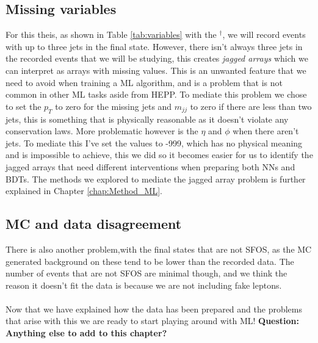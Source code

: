 \documentclass[14pt, a4paper]{book}
\begin{document}
\subsection{Missing variables}\label{sec:jagged_arrays}
For this theis, as shown in Table \ref{tab:variables} with the $^\dagger$, we will record events with up to three jets in the final state. However, there isn't always three jets in the recorded events that we will be studying, 
this creates \textit{jagged arrays} which we can interpret as arrays with missing values. This is an unwanted feature that we need to avoid when training a ML algorithm, and is a problem that is not common in other ML tasks aside from HEPP.
To mediate this problem we chose to set the $p_T$ to zero for the missing jets and $m_{jj}$ to zero if there are less than two jets, this is something that is physically reasonable as it doesn't violate any conservation laws. 
More problematic however is the $\eta$ and $\phi$ when there aren't jets. To mediate this I've set the values to -999, which has no physical meaning and is impossible to achieve, this we did so it becomes easier for us to identify the jagged arrays that 
need different interventions when preparing both NNs and BDTs. The methods we explored to mediate the jagged array problem is further explained in Chapter \ref{chap:Method_ML}. 

\subsection{MC and data disagreement} 
There is also another problem,with the final states that are not SFOS, as the MC generated background 
on these tend to be lower than the recorded data. The number of events that are not SFOS are minimal though, and we think the reason it doesn't fit the data is because we are not including fake leptons. \\
\\Now that we have explained how the data has been prepared and the problems that arise with this we are ready to start playing around with ML!
\textbf{Question: Anything else to add to this chapter?}
\end{document}
